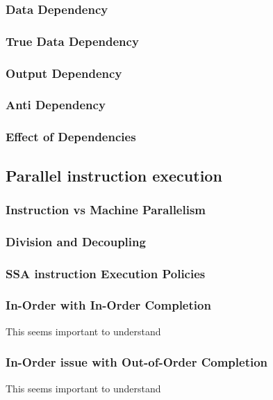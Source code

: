 \documentclass[titlepage, a4paper]{article}
\begin{document}
\subsubsection{Data Dependency}

\subsubsection{True Data Dependency}

\subsubsection{Output Dependency}

\subsubsection{Anti Dependency}

\subsubsection{Effect of Dependencies}

\subsection{Parallel instruction execution}

\subsubsection{Instruction vs Machine Parallelism}

\subsubsection{Division and Decoupling}

\subsubsection{SSA instruction Execution Policies}

\subsubsection{In-Order with In-Order Completion}
This seems important to understand

\subsubsection{In-Order issue with Out-of-Order Completion}
This seems important to understand
\end{document}
